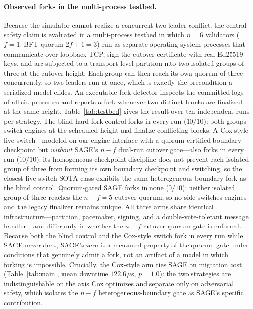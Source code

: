 \documentclass[journal]{IEEEtran}
\theoremstyle{remark}
\begin{document}
\paragraph{Observed forks in the multi-process testbed.}
Because the simulator cannot realize a concurrent two-leader conflict, the central safety claim
is evaluated in a multi-process testbed in which $n{=}6$ validators ($f{=}1$, BFT quorum
$2f{+}1{=}3$) run as separate operating-system processes that communicate over loopback TCP, sign
the cutover certificate with real Ed25519 keys, and are subjected to a transport-level partition
into two isolated groups of three at the cutover height. Each group can then reach its own quorum
of three concurrently, so two leaders run at once, which is exactly the precondition a serialized
model elides. An executable fork detector inspects the committed logs of all six processes and
reports a fork whenever two distinct blocks are finalized at the same height. Table~\ref{tab:testbed}
gives the result over ten independent runs per strategy. The blind hard-fork control forks in
every run ($10/10$): both groups switch engines at the scheduled height and finalize conflicting
blocks. A Cox-style live switch---modeled on our engine interface with a quorum-certified
boundary checkpoint but \emph{without} SAGE's $n{-}f$ dual-run cutover gate---also forks in every
run ($10/10$): its homogeneous-checkpoint discipline does not prevent each isolated group of
three from forming its own boundary checkpoint and switching, so the closest live-switch SOTA
class exhibits the same heterogeneous-boundary fork as the blind control. Quorum-gated SAGE forks
in none ($0/10$): neither isolated group of three reaches the
$n{-}f{=}5$ cutover quorum, so no side switches engines and the legacy finalizer remains unique.
All three arms share identical infrastructure---partition, pacemaker, signing, and a
double-vote-tolerant message handler---and differ only in whether the $n{-}f$ cutover quorum gate
is enforced. Because both the blind control and the Cox-style switch fork in every run while SAGE
never does, SAGE's zero is a measured property of the
quorum gate under conditions that genuinely admit a fork, not an artifact of a model in which
forking is impossible. Crucially, the Cox-style arm ties SAGE on migration cost
(Table~\ref{tab:main}, mean downtime $122.6\,\mu$s, $p=1.0$): the two strategies are
indistinguishable on the axis Cox optimizes and separate only on adversarial safety, which
isolates the $n{-}f$ heterogeneous-boundary gate as SAGE's specific contribution.
\end{document}
